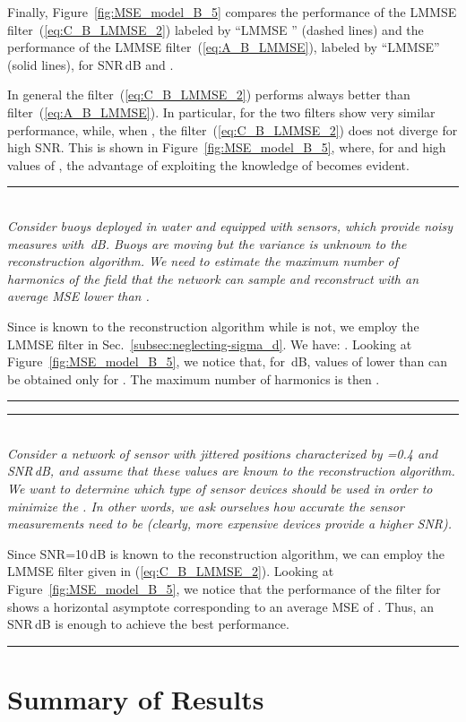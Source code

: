 \documentclass[final, a4paper]{IEEEtran}
\newcommand{\example}[2]{
\begin{center}
\parbox{0.95\columnwidth}{
\rule{0.95\columnwidth}{0.5mm}\\
\noindent {\bf Example~#1:}
#2\\
\rule{0.95\columnwidth}{0.5mm}
}
\end{center}
}
\begin{document}
Finally, Figure~\ref{fig:MSE_model_B_5} compares
the performance of the LMMSE filter~(\ref{eq:C_B_LMMSE_2})
labeled by ``LMMSE '' (dashed lines) and the performance of the LMMSE filter~(\ref{eq:A_B_LMMSE}),
labeled by ``LMMSE'' (solid lines), for SNR\,dB and .

In general the filter~(\ref{eq:C_B_LMMSE_2}) performs always better than filter~(\ref{eq:A_B_LMMSE}).
In particular, for  the two filters show very similar performance, while,
when ,
the filter~(\ref{eq:C_B_LMMSE_2}) does not diverge for high SNR.
This is shown in Figure~\ref{fig:MSE_model_B_5},
where, for  and high values of ,
the advantage of exploiting the knowledge of 
becomes evident.

\medskip
\example{2}{{\it Consider  buoys  deployed in water and
equipped with sensors, which provide noisy measures with \,dB.
Buoys are moving but the variance  is unknown to the reconstruction algorithm.
We need to estimate the maximum number of harmonics of the field that the network can sample and reconstruct
with an average MSE lower than .
}

Since   is known to the reconstruction algorithm
while  is not, we employ the LMMSE filter in Sec.~\ref{subsec:neglecting-sigma_d}.
We have: . Looking at
Figure~\ref{fig:MSE_model_B_5}, we notice that, for \,dB, values of  lower than  can be
obtained only for . The maximum number of harmonics is
then .
} 

\medskip
\example{3}{ {\it Consider a  network of sensor with jittered positions
characterized by =0.4 and {\rm SNR}\,dB, and assume that
these values are known to the reconstruction algorithm. We want to
determine which type of sensor devices should be used  in order to
minimize the . In other words, we ask ourselves how accurate
the sensor measurements need to be (clearly, more expensive devices
provide a higher {\rm SNR}). }

Since SNR=10\,dB is known to the reconstruction algorithm, we
can employ the LMMSE filter given in (\ref{eq:C_B_LMMSE_2}). Looking
at Figure~\ref{fig:MSE_model_B_5}, we notice that the performance of
the filter for  shows a horizontal asymptote
corresponding to an average MSE of . Thus, an SNR\,dB is enough to achieve the best performance.
} 

\section{Summary of Results}
\label{sec:summary}
\end{document}
